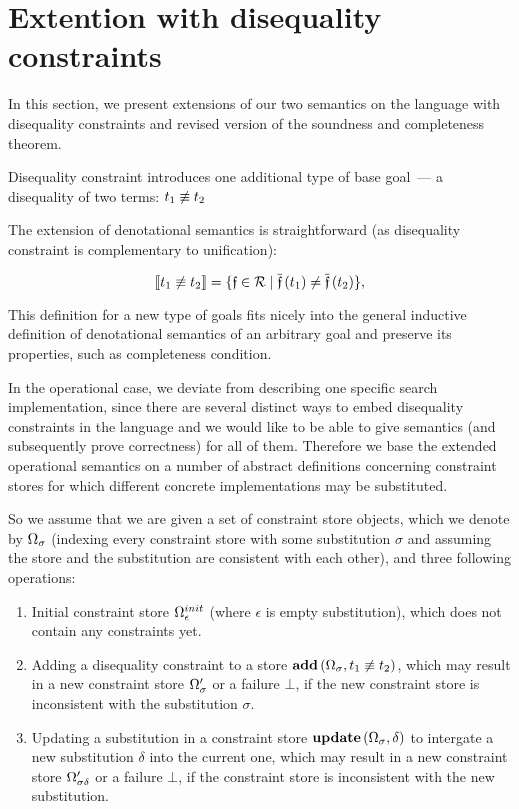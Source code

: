 \section{Extention with disequality constraints}

In this section, we present extensions of our two semantics on the language with disequality constraints and revised version of the soundness and completeness theorem.

Disequality constraint introduces one additional type of base goal~--- a disequality of two terms: $t_1 \not\equiv t_2$

The extension of denotational semantics is straightforward (as disequality constraint is complementary to unification):

\[ \llbracket{t_1 \not\equiv t_2}\rrbracket  =  \{\mathfrak{f} \in \mathcal{R} \mid \overline{\mathfrak{f}}\,(t_1) \neq \overline{\mathfrak{f}}\,(t_2)\}, \]

This definition for a new type of goals fits nicely into the general inductive definition of denotational semantics of an arbitrary goal
and preserve its properties, such as completeness condition.

In the operational case, we deviate from describing one specific search implementation, since there are several distinct ways to embed disequality constraints
in the language and we would like to be able to give semantics (and subsequently prove correctness) for all of them. Therefore we base the extended operational
semantics on a number of abstract definitions concerning constraint stores for which different concrete implementations may be substituted.

So we assume that we are given a set of constraint store objects, which we denote by $\Omega_\sigma$ (indexing every constraint store with
some substitution $\sigma$ and assuming the store and the substitution are consistent with each other), and three following operations:

\begin{enumerate}
\item Initial constraint store $\Omega_\epsilon^{init}$ (where $\epsilon$ is empty substitution), which does not contain any constraints yet.
\item Adding a disequality constraint to a store $\mathbf{add}\,(\Omega_\sigma, t_1 \not\equiv t_2)$, which may result in a new constraint store $\Omega^\prime_\sigma$ or a failure $\bot$,
  if the new constraint store is inconsistent with the substitution $\sigma$.
\item Updating a substitution in a constraint store $\mathbf{update}\,(\Omega_\sigma, \delta)$ to intergate a new substitution $\delta$ into the current one,
  which may result in a new constraint store $\Omega^\prime_{\sigma \delta}$ or a failure $\bot$, if the constraint store is inconsistent with the new substitution.
\end{enumerate}


